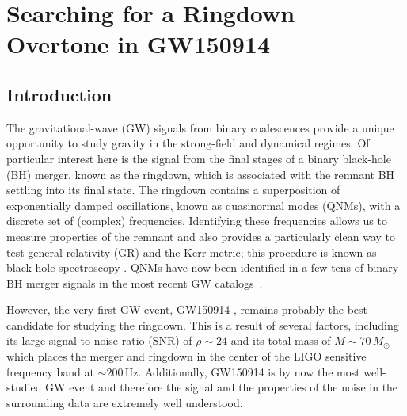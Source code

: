 

\chapter{Searching for a Ringdown Overtone in GW150914}

\label{Chapter4}

\section{Introduction}\label{sec:introduction}

The gravitational-wave (GW) signals from binary coalescences provide a unique opportunity to study gravity in the strong-field and dynamical regimes.
Of particular interest here is the signal from the final stages of a binary black-hole (BH) merger, known as the ringdown, which is associated with the remnant BH settling into its final state.
The ringdown contains a superposition of exponentially damped oscillations, known as quasinormal modes (QNMs), with a discrete set of (complex) frequencies.
Identifying these frequencies allows us to measure properties of the remnant and also provides a particularly clean way to test general relativity (GR) and the Kerr metric; this procedure is known as black hole spectroscopy \cite{Dreyer:2003bv}.
QNMs have now been identified in a few tens of binary BH merger signals in the most recent GW catalogs~\cite{LIGOScientific:2020tif, LIGOScientific:2021sio}.

However, the very first GW event, GW150914 \cite{LIGOScientific:2016aoc}, remains probably the best candidate for studying the ringdown.
This is a result of several factors, including its large signal-to-noise ratio (SNR) of $\rho\sim 24$ and its total mass of $M\sim 70\,M_\odot$ which places the merger and ringdown in the center of the LIGO \cite{LIGOScientific:2014pky} sensitive frequency band at $\sim 200\,\mathrm{Hz}$. 
Additionally, GW150914 is by now the most well-studied GW event and therefore the signal and the properties of the noise in the surrounding data are extremely well understood.

